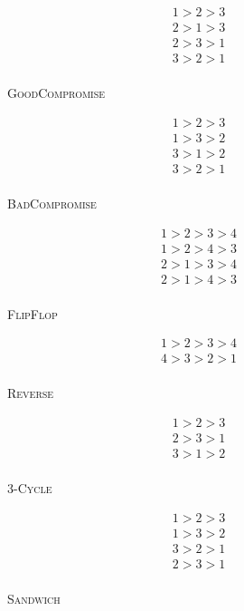 \documentclass[12pt]{article}
\newcommand{\1}[1]{\mathds{1}[{#1}]}
\begin{document}
  \begin{wrapfigure}{r}{0.2\textwidth}
    \begin{center}
      \vspace{-0.25in}
      \begin{align*}
        1 > 2 > 3 \\
        2 > 1 > 3 \\
        2 > 3 > 1 \\
        3 > 2 > 1 \\
      \end{align*}
      \caption*{\textsc{GoodCompromise}}
      \vspace{-0.25in}
      \begin{align*}
        1 > 2 > 3 \\
        1 > 3 > 2 \\
        3 > 1 > 2 \\
        3 > 2 > 1 \\
      \end{align*}
      \caption*{\textsc{BadCompromise}}
      \vspace{-0.25in}
      \begin{align*}
        1 > 2 > 3 > 4 \\
        1 > 2 > 4 > 3 \\
        2 > 1 > 3 > 4 \\
        2 > 1 > 4 > 3 \\
      \end{align*}
      \caption*{\textsc{FlipFlop}}
      \vspace{-0.25in}
      \begin{align*}
        1 > 2 > 3 > 4 \\
        4 > 3 > 2 > 1 \\
      \end{align*}
      \caption*{\textsc{Reverse}}
      \vspace{-0.25in}
      \begin{align*}
        1 > 2 > 3 \\
        2 > 3 > 1 \\
        3 > 1 > 2 \\
      \end{align*}
      \caption*{$3$-\textsc{Cycle}}
      \vspace{-0.25in}
      \begin{align*}
        1 > 2 > 3 \\
        1 > 3 > 2 \\
        3 > 2 > 1 \\
        2 > 3 > 1 \\
      \end{align*}
      \caption*{\textsc{Sandwich}}
      \vspace{-0.5in}
    \end{center}
  \end{wrapfigure}
\end{document}
